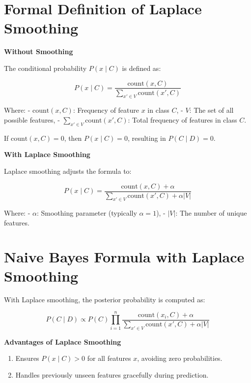 \documentclass[
  12 pt,
  a4paper,
]{book}
\providecommand{\tightlist}{%
  \setlength{\itemsep}{0pt}\setlength{\parskip}{0pt}}
\numberwithin{equation}{section}
\theoremstyle{plain}      %
\theoremstyle{definition} %
\theoremstyle{remark}     %
\theoremstyle{note}         %
\begin{document}
\hypertarget{formal-definition-of-laplace-smoothing}{%
\section{Formal Definition of Laplace
Smoothing}\label{formal-definition-of-laplace-smoothing}}

\textbf{Without Smoothing}

The conditional probability \(P(x \mid C)\) is defined as:

\[
P(x \mid C) = \frac{\text{count}(x, C)}{\sum_{x' \in V} \text{count}(x', C)}
\]

Where: - \(\text{count}(x, C)\): Frequency of feature \(x\) in class
\(C\), - \(V\): The set of all possible features, -
\(\sum_{x' \in V} \text{count}(x', C)\): Total frequency of features in
class \(C\).

If \(\text{count}(x, C) = 0\), then \(P(x \mid C) = 0\), resulting in
\(P(C \mid D) = 0\).

\textbf{With Laplace Smoothing}

Laplace smoothing adjusts the formula to:

\[
P(x \mid C) = \frac{\text{count}(x, C) + \alpha}{\sum_{x' \in V} \text{count}(x', C) + \alpha |V|}
\]

Where: - \(\alpha\): Smoothing parameter (typically \(\alpha = 1\)), -
\(|V|\): The number of unique features.

\hypertarget{naive-bayes-formula-with-laplace-smoothing}{%
\section{Naive Bayes Formula with Laplace
Smoothing}\label{naive-bayes-formula-with-laplace-smoothing}}

With Laplace smoothing, the posterior probability is computed as:

\[
P(C \mid D) \propto P(C) \prod_{i=1}^n \frac{\text{count}(x_i, C) + \alpha}{\sum_{x' \in V} \text{count}(x', C) + \alpha |V|}
\]

\textbf{Advantages of Laplace Smoothing}

\begin{enumerate}
\def\labelenumi{\arabic{enumi}.}
\tightlist
\item
  Ensures \(P(x \mid C) > 0\) for all features \(x\), avoiding zero
  probabilities.
\item
  Handles previously unseen features gracefully during prediction.
\end{enumerate}
\end{document}
